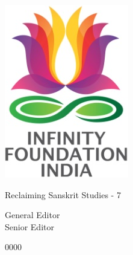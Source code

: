 \thispagestyle{empty}

\includegraphics{images/logo.png}

Reclaiming Sanskrit Studies - 7


General Editor\\

Senior Editor\\


0000


